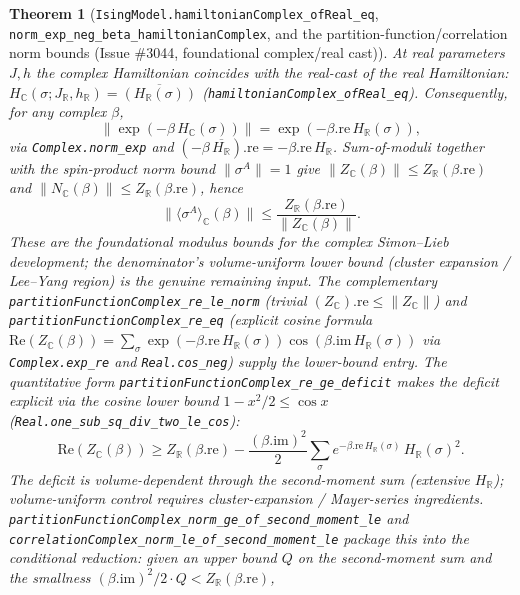 \documentclass[a4paper,11pt]{article}
\newtheorem{theorem}{Theorem}
\begin{document}
\begin{theorem}[\texttt{IsingModel.hamiltonianComplex\_ofReal\_eq},
\texttt{norm\_exp\_neg\_beta\_hamiltonianComplex}, and the partition-function/correlation
norm bounds (Issue \#3044, foundational complex/real cast)]
At real parameters \(J,h\) the complex Hamiltonian coincides with the real-cast of the real
Hamiltonian: \(H_\mathbb{C}(\sigma;J_\mathbb{R},h_\mathbb{R})=\overline{(H_\mathbb{R}(\sigma))}\)
(\texttt{hamiltonianComplex\_ofReal\_eq}).  Consequently, for any complex \(\beta\),
\[
  \bigl\|\exp(-\beta\,H_\mathbb{C}(\sigma))\bigr\| = \exp(-\beta.\mathrm{re}\,H_\mathbb{R}(\sigma)),
\]
via \texttt{Complex.norm\_exp} and \((-\beta\,\overline{H_\mathbb{R}}).\mathrm{re}=-\beta.\mathrm{re}\,H_\mathbb{R}\).
Sum-of-moduli together with the spin-product norm bound \(\|\sigma^A\|=1\) give
\(\|Z_\mathbb{C}(\beta)\|\le Z_\mathbb{R}(\beta.\mathrm{re})\) and
\(\|N_\mathbb{C}(\beta)\|\le Z_\mathbb{R}(\beta.\mathrm{re})\), hence
\[
  \|\langle\sigma^A\rangle_\mathbb{C}(\beta)\| \le
    \frac{Z_\mathbb{R}(\beta.\mathrm{re})}{\|Z_\mathbb{C}(\beta)\|}.
\]
These are the foundational modulus bounds for the complex Simon--Lieb development; the
denominator's volume-uniform lower bound (cluster expansion / Lee--Yang region) is the
genuine remaining input.  The complementary
\texttt{partitionFunctionComplex\_re\_le\_norm} (trivial \((Z_{\mathbb{C}}).\mathrm{re}\le\|Z_{\mathbb{C}}\|\))
and \texttt{partitionFunctionComplex\_re\_eq} (explicit cosine formula
\(\mathrm{Re}(Z_{\mathbb{C}}(\beta))=\sum_\sigma\exp(-\beta.\mathrm{re}\,H_{\mathbb{R}}(\sigma))\cos(\beta.\mathrm{im}\,H_{\mathbb{R}}(\sigma))\)
via \texttt{Complex.exp\_re} and \texttt{Real.cos\_neg}) supply the lower-bound entry.  The quantitative form
\texttt{partitionFunctionComplex\_re\_ge\_deficit} makes the deficit explicit via the
cosine lower bound \(1-x^2/2\le\cos x\)
(\texttt{Real.one\_sub\_sq\_div\_two\_le\_cos}):
\[
  \mathrm{Re}(Z_{\mathbb{C}}(\beta)) \ge Z_{\mathbb{R}}(\beta.\mathrm{re})
    - \frac{(\beta.\mathrm{im})^2}{2}\sum_\sigma e^{-\beta.\mathrm{re}\,H_{\mathbb{R}}(\sigma)}\,H_{\mathbb{R}}(\sigma)^2.
\]
The deficit is volume-dependent through the second-moment sum (extensive \(H_{\mathbb{R}}\));
volume-uniform control requires cluster-expansion / Mayer-series ingredients.
\texttt{partitionFunctionComplex\_norm\_ge\_of\_second\_moment\_le} and
\texttt{correlationComplex\_norm\_le\_of\_second\_moment\_le} package this into the
conditional reduction: given an upper bound \(Q\) on the second-moment sum and the
smallness \((\beta.\mathrm{im})^2/2\cdot Q<Z_{\mathbb{R}}(\beta.\mathrm{re})\),

\end{theorem}
\end{document}
